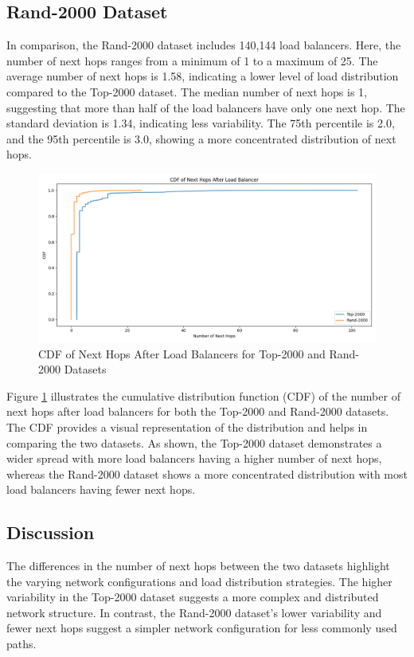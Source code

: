 \documentclass[12pt]{cwru_thesis}
\begin{document}
\subsection{Rand-2000 Dataset}
In comparison, the Rand-2000 dataset includes 140,144 load balancers. Here, the number of next hops ranges from a minimum of 1 to a maximum of 25. The average number of next hops is 1.58, indicating a lower level of load distribution compared to the Top-2000 dataset. The median number of next hops is 1, suggesting that more than half of the load balancers have only one next hop. The standard deviation is 1.34, indicating less variability. The 75th percentile is 2.0, and the 95th percentile is 3.0, showing a more concentrated distribution of next hops.

\begin{figure}[h]
    \centering
    \includegraphics[width=\linewidth]{figures/cdf_next_hops.png}
    \caption{CDF of Next Hops After Load Balancers for Top-2000 and Rand-2000 Datasets}
    \label{fig:cdf_next_hops}
\end{figure}

Figure \ref{fig:cdf_next_hops} illustrates the cumulative distribution function (CDF) of the number of next hops after load balancers for both the Top-2000 and Rand-2000 datasets. The CDF provides a visual representation of the distribution and helps in comparing the two datasets. As shown, the Top-2000 dataset demonstrates a wider spread with more load balancers having a higher number of next hops, whereas the Rand-2000 dataset shows a more concentrated distribution with most load balancers having fewer next hops.

\subsection{Discussion}
The differences in the number of next hops between the two datasets highlight the varying network configurations and load distribution strategies. The higher variability in the Top-2000 dataset suggests a more complex and distributed network structure. In contrast, the Rand-2000 dataset's lower variability and fewer next hops suggest a simpler network configuration for less commonly used paths.
\end{document}
